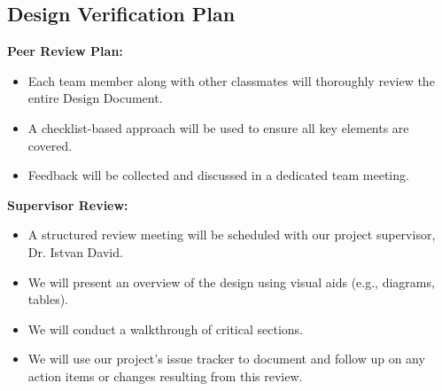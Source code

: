 \documentclass[12pt, titlepage]{article}
\begin{document}
\subsection{Design Verification Plan}

\textbf{Peer Review Plan:}
\begin{itemize}
  \item Each team member along with other classmates will thoroughly
    review the entire Design Document.
  \item A checklist-based approach will be used to ensure all key
    elements are covered.
  \item Feedback will be collected and discussed in a dedicated team meeting.
\end{itemize}

\textbf{Supervisor Review:}
\begin{itemize}
  \item A structured review meeting will be scheduled with our
    project supervisor, Dr. Istvan David.
  \item We will present an overview of the design using visual aids
    (e.g., diagrams, tables).
  \item We will conduct a walkthrough of critical sections.
  \item We will use our project's issue tracker to document and
    follow up on any action items or changes resulting from this review.
\end{itemize}
\end{document}
